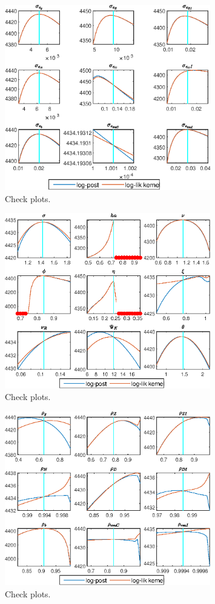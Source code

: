  
\begin{figure}[H]
\centering 
\includegraphics[width=0.80\textwidth]{BRS_sectoral_wo_vcu/graphs/BRS_sectoral_wo_vcu_CheckPlots1}
\caption{Check plots.}\label{Fig:CheckPlots:1}
\end{figure}
 
\begin{figure}[H]
\centering 
\includegraphics[width=0.80\textwidth]{BRS_sectoral_wo_vcu/graphs/BRS_sectoral_wo_vcu_CheckPlots2}
\caption{Check plots.}\label{Fig:CheckPlots:2}
\end{figure}
 
\begin{figure}[H]
\centering 
\includegraphics[width=0.80\textwidth]{BRS_sectoral_wo_vcu/graphs/BRS_sectoral_wo_vcu_CheckPlots3}
\caption{Check plots.}\label{Fig:CheckPlots:3}
\end{figure}
 

